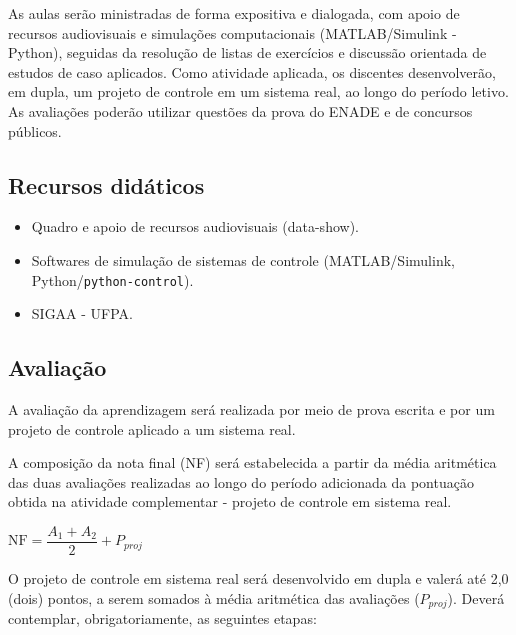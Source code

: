 \documentclass[oneside,a4paper,12pt]{article}
\begin{document}
As aulas serão ministradas de forma expositiva e dialogada, com apoio de recursos audiovisuais e simulações computacionais (MATLAB/Simulink - Python), seguidas da resolução de listas de exercícios e discussão orientada de estudos de caso aplicados. Como atividade aplicada, os discentes desenvolverão, em dupla, um projeto de controle em um sistema real, ao longo do período letivo. As avaliações poderão utilizar questões da prova do ENADE e de concursos públicos.

  \begin{snugshade}
  \section{Recursos didáticos} %
  \end{snugshade}
    \begin{itemize}
	  \item Quadro e apoio de recursos audiovisuais (data-show).
	  \item Softwares de simulação de sistemas de controle (MATLAB/Simulink, Python/\texttt{python-control}).
	  \item SIGAA - UFPA.
    \end{itemize}
  \begin{snugshade}
\section{Avaliação}
\end{snugshade}

A avaliação da aprendizagem será realizada por meio de prova escrita e por um projeto de controle aplicado a um sistema real.

A composição da nota final (NF) será estabelecida a partir da média aritmética das duas avaliações realizadas ao longo do período adicionada da pontuação obtida na atividade complementar - projeto de controle em sistema real.

\begin{center}
$\mathrm{NF} = \dfrac{A_1 + A_2}{2} +P_{proj}$
\end{center}

O projeto de controle em sistema real será desenvolvido em dupla e valerá até 2,0 (dois) pontos, a serem somados à média aritmética das avaliações ($P_{proj}$). Deverá contemplar, obrigatoriamente, as seguintes etapas:
\end{document}
